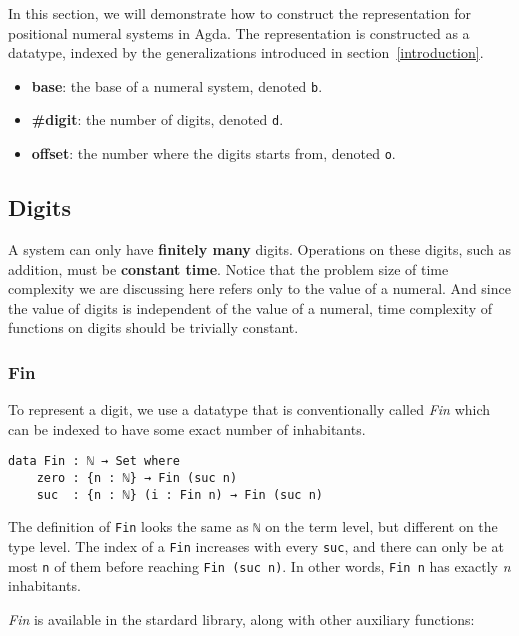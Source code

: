 \documentclass[12pt, a4paper]{article}
\begin{document}
In this section, we will demonstrate how to construct the representation for positional
numeral systems in Agda. The representation is constructed as a datatype, indexed
by the generalizations introduced in section~\ref{introduction}.

\begin{itemize}
    \item \textbf{base}: the base of a numeral system, denoted {\lstinline|b|}.
    \item \textbf{\#digit}: the number of digits, denoted {\lstinline|d|}.
    \item \textbf{offset}: the number where the digits starts from, denoted {\lstinline|o|}.
\end{itemize}

\subsection{Digits}

A system can only have \textbf{finitely many} digits.
Operations on these digits, such as addition, must be \textbf{constant time}.
Notice that the problem size of time complexity we are discussing here refers
only to the value of a numeral. And since the value of digits is independent of
the value of a numeral, time complexity of functions on digits should be trivially
constant.

\subsubsection{Fin}

To represent a digit, we use a datatype that is conventionally called \textit{Fin}
which can be indexed to have some exact number of inhabitants.


\begin{lstlisting}
data Fin : ℕ → Set where
    zero : {n : ℕ} → Fin (suc n)
    suc  : {n : ℕ} (i : Fin n) → Fin (suc n)
\end{lstlisting}

The definition of {\lstinline|Fin|} looks the same as {\lstinline|ℕ|} on the term
level, but different on the type level. The index of a {\lstinline|Fin|} increases
with every {\lstinline|suc|}, and there can only be at most {\lstinline|n|} of
them before reaching {\lstinline|Fin (suc n)|}. In other words, {\lstinline|Fin n|}
has exactly \textit{n} inhabitants.

\textit{Fin} is available in the stardard library, along with other auxiliary
functions:
\end{document}
